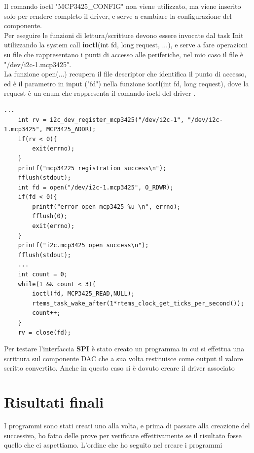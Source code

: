 \documentclass[12pt, a4paper, titlepage, oneside]{book}
\begin{document}
\begin{flushleft}
Il comando ioctl "MCP3425\_CONFIG" non viene utilizzato, ma viene inserito solo per rendere completo il driver, e serve a cambiare la configurazione del componente.\\
\newpage
Per eseguire le funzioni di lettura/scritture devono essere invocate dal task Init utilizzando la system call \textbf{ioctl}(int fd, long request, ...), e serve a fare operazioni su file che rappresentano i punti di accesso alle periferiche, nel mio caso il file è "/dev/i2c-1.mcp3425". \\
La funzione open(...) recupera il file descriptor che identifica il punto di accesso, ed è il parametro in input ("fd")  nella funzione ioctl(int fd, long request), dove la request è un enum che rappresenta il comando ioctl del driver .\\
\begin{lstlisting}[style = CStyle]
    ...
	int rv = i2c_dev_register_mcp3425("/dev/i2c-1", "/dev/i2c-1.mcp3425", MCP3425_ADDR);
	if(rv < 0){
		exit(errno);
	}
	printf("mcp34225 registration success\n");
	fflush(stdout);
	int fd = open("/dev/i2c-1.mcp3425", O_RDWR);
	if(fd < 0){
		printf("error open mcp3425 %u \n", errno);
		fflush(0);
		exit(errno);
	}
	printf("i2c.mcp3425 open success\n");
	fflush(stdout);
	...
	int count = 0;
	while(1 && count < 3){
		ioctl(fd, MCP3425_READ,NULL);
		rtems_task_wake_after(1*rtems_clock_get_ticks_per_second());
		count++;
	}
	rv = close(fd);
\end{lstlisting}

\newpage
Per testare l'interfaccia \textbf{SPI} è stato creato un programma in cui si effettua una scrittura sul componente DAC che a sua volta restituisce come output il valore scritto convertito. Anche in questo caso si è dovuto creare il driver associato \\
\newpage
\section{Risultati finali}
I programmi sono stati creati uno alla volta, e prima di passare alla creazione del successivo, ho fatto delle prove per verificare effettivamente se il risultato fosse quello che ci aspettiamo.
L'ordine che ho seguito nel creare i programmi 

\end{flushleft}
\end{document}
